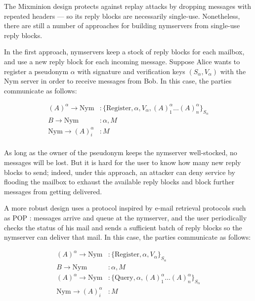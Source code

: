 \documentclass[11pt]{IEEEtran}
\begin{document}
The Mixminion design protects against replay attacks by dropping messages
with repeated headers --- so its reply blocks are necessarily
single-use. Nonetheless, there are still a number of approaches for building
nymservers from single-use reply blocks.

In the first approach, nymservers keep a stock of reply blocks for
each mailbox, and use a new reply block for each incoming message. 
Suppose Alice wants to register a pseudonym $\alpha$ with signature and
verification keys $(S_\alpha,V_\alpha)$ with the Nym server in order
to receive messages from Bob.  In this case, the parties communicate as
follows: 

\begin{equation}
\begin{aligned}
(A)^\alpha \rightarrow \mathrm{Nym}&: \{\mathrm{Register} , \alpha, V_{\alpha}, (A)^\alpha_1 \dots
(A)^\alpha_n\}_{S_\alpha} \\ 
B \rightarrow \mathrm{Nym}&: \alpha, M \\ 
\mathrm{Nym} \rightarrow (A)^\alpha_i&: M \\
\end{aligned}
\end{equation}

As long
as the owner of the pseudonym keeps the nymserver well-stocked, no
messages will be lost.  But it is hard for the user to know how many
new reply blocks to send; indeed, under this approach, an attacker can
deny service by flooding the mailbox to exhaust the available
reply blocks and block further messages from getting delivered.

A more robust design uses a protocol inspired by e-mail retrieval
protocols such as POP \cite{POP3}:
messages arrive and queue at the nymserver, and the user periodically
checks the status of his mail and sends a sufficient batch of reply
blocks so the nymserver can deliver that mail.  In this case, the parties
communicate as follows:

\begin{equation}
\begin{aligned}
(A)^\alpha \rightarrow \mathrm{Nym}&: \{\mathrm{Register} , \alpha, V_{\alpha}\}_{S_{\alpha}}\\
B \rightarrow \mathrm{Nym}&: \alpha, M \\
(A)^\alpha \rightarrow \mathrm{Nym}&: \{\mathrm{Query} ,\alpha, (A)^\alpha_1 \dots
(A)^\alpha_n\}_{S_{\alpha}} \\
\mathrm{Nym} \rightarrow (A)^\alpha_i&: M
\end{aligned}
\end{equation}
\end{document}

